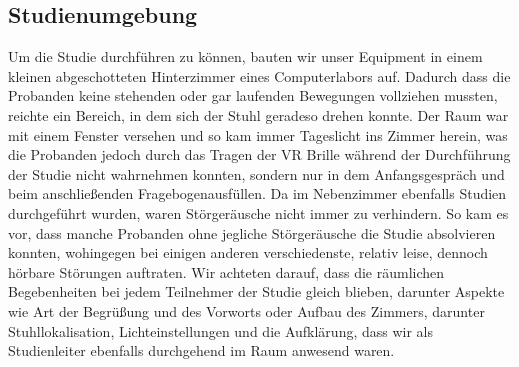 \subsection{Studienumgebung}
Um die Studie durchführen zu können, bauten wir unser Equipment in einem kleinen abgeschotteten Hinterzimmer eines Computerlabors auf. Dadurch dass die Probanden keine stehenden oder gar laufenden Bewegungen vollziehen mussten, reichte ein Bereich, in dem sich der Stuhl geradeso drehen konnte. Der Raum war mit einem Fenster versehen und so kam immer Tageslicht ins Zimmer herein, was die Probanden jedoch durch das Tragen der VR Brille während der Durchführung der Studie nicht wahrnehmen konnten, sondern nur in dem Anfangsgespräch und beim anschließenden Fragebogenausfüllen. Da im Nebenzimmer ebenfalls Studien durchgeführt wurden, waren Störgeräusche nicht immer zu verhindern. So kam es vor, dass manche Probanden ohne jegliche Störgeräusche die Studie absolvieren konnten, wohingegen bei einigen anderen verschiedenste, relativ leise, dennoch hörbare Störungen auftraten. Wir achteten darauf, dass die räumlichen Begebenheiten bei jedem Teilnehmer der Studie gleich blieben, darunter Aspekte wie Art der Begrüßung und des Vorworts oder Aufbau des Zimmers, darunter Stuhllokalisation, Lichteinstellungen und die Aufklärung, dass wir als Studienleiter ebenfalls durchgehend im Raum anwesend waren. 

